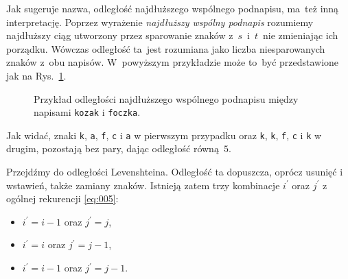 \documentclass{praca1}
\begin{document}
Jak sugeruje nazwa, odległość najdłuższego wspólnego podnapisu, ma~też inną interpretację. Poprzez wyrażenie \emph{najdłuższy wspólny podnapis} rozumiemy najdłuższy ciąg utworzony przez sparowanie znaków z~$s$~i~$t$~nie zmieniając ich porządku. Wówczas odległość ta~jest rozumiana jako liczba niesparowanych znaków z~obu napisów. W~powyższym przykładzie może to~być przedstawione jak na Rys.~\ref{rys:003}.
	
	

\begin{figure}[width=80pt]
\centering
{}
\cprotect\caption{Przykład odległości najdłuższego wspólnego podnapisu między napisami \verb|kozak| i \verb|foczka|.}\label{rys:003}
\end{figure}

Jak widać, znaki \verb|k|, \verb|a|, \verb|f|, \verb|c| i \verb|a| w pierwszym przypadku oraz \verb|k|, \verb|k|, \verb|f|, \verb|c| i \verb|k| w drugim, pozostają bez pary, dając odległość równą~$5$.





Przejdźmy do odległości Levenshteina. Odległość ta dopuszcza, oprócz usunięć i wstawień, także zamiany znaków. Istnieją zatem  trzy kombinacje $i^\prime$ oraz $j^\prime$ z ogólnej rekurencji \eqref{eq:005}:
\begin{itemize}
\item $i^\prime = i - 1$ oraz $j^\prime = j$,
\item $i^\prime = i$ oraz $j^\prime = j - 1$,
\item $i^\prime = i - 1$ oraz $j^\prime = j - 1$.
\end{itemize}
\end{document}
